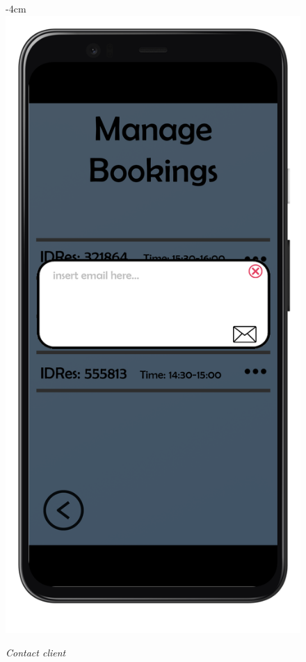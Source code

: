 \documentclass{article}
\begin{document}
			\begin{figure}[H]
				\begin{adjustwidth} {-4cm}{}
					\centering
					\includegraphics[scale=0.45]{../Mockups/MBpopup2}\\
				\end{adjustwidth}
				\caption{\emph{Contact client}}
			\end{figure}
		
\end{document}
